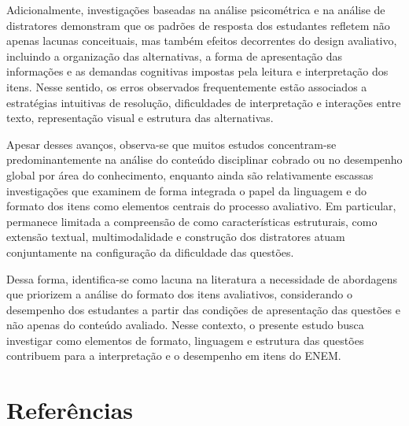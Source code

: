\documentclass[a4paper,10pt, twocolumn]{article}
\begin{document}
Adicionalmente, investigações baseadas na análise psicométrica e na análise de distratores demonstram que os padrões de resposta dos estudantes refletem não apenas lacunas conceituais, mas também efeitos decorrentes do design avaliativo, incluindo a organização das alternativas, a forma de apresentação das informações e as demandas cognitivas impostas pela leitura e interpretação dos itens. Nesse sentido, os erros observados frequentemente estão associados a estratégias intuitivas de resolução, dificuldades de interpretação e interações entre texto, representação visual e estrutura das alternativas.

Apesar desses avanços, observa-se que muitos estudos concentram-se predominantemente na análise do conteúdo disciplinar cobrado ou no desempenho global por área do conhecimento, enquanto ainda são relativamente escassas investigações que examinem de forma integrada o papel da linguagem e do formato dos itens como elementos centrais do processo avaliativo. Em particular, permanece limitada a compreensão de como características estruturais, como extensão textual, multimodalidade e construção dos distratores atuam conjuntamente na configuração da dificuldade das questões.

Dessa forma, identifica-se como lacuna na literatura a necessidade de abordagens que priorizem a análise do formato dos itens avaliativos, considerando o desempenho dos estudantes a partir das condições de apresentação das questões e não apenas do conteúdo avaliado. Nesse contexto, o presente estudo busca investigar como elementos de formato, linguagem e estrutura das questões contribuem para a interpretação e o desempenho em itens do ENEM.


\section{Referências}
\printbibliography[heading=none]
\end{document}

